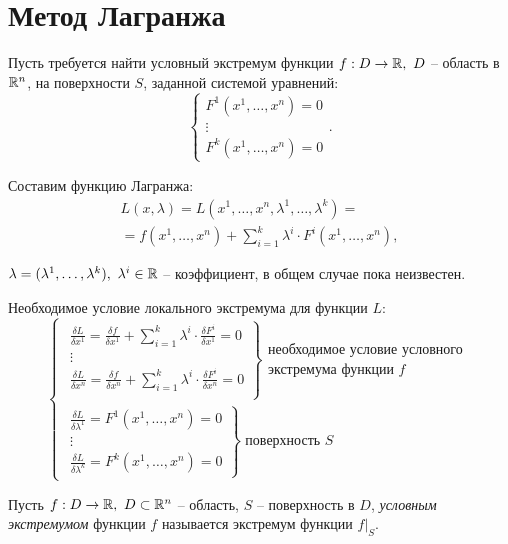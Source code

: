\section*{Метод Лагранжа}

\begin{task}
    Пусть требуется найти условный экстремум функции $f:D\rightarrow\mathbb{R}, \ D$ -- область в $\mathbb{R}^n$, на поверхности $S$, заданной системой уравнений:
    \[
        \left\{\begin{array}{l}
            F^1(x^1,\ldots,x^n) = 0 \\
            \vdots                  \\
            F^k(x^1,\ldots,x^n) = 0
          \end{array}\right..
    \]
    
    Составим функцию Лагранжа:
    \begin{multline*}
      L(x,\lambda) = L(x^1,\ldots,x^n,\lambda^1,\ldots,\lambda^k) = \\
      = f(x^1,\ldots,x^n) + \sum_{i=1}^{k}\lambda^i\cdot F^i(x^1,\ldots,x^n),
    \end{multline*}
    
    $\lambda = (\lambda^1,\ldots,\lambda^k), \ \lambda^i \in \R$ -- коэффициент, в общем случае пока неизвестен.
    
    Необходимое условие локального экстремума для функции $L:$
    \begin{equation}\label{eq:24}
      \left\{\begin{array}{l}
        \left.\begin{array}{l}
            \frac{\delta L}{\delta x^1} = \frac{\delta f}{\delta x^1} + \sum_{i = 1}^{k}\lambda^i\cdot\frac{\delta F^i}{\delta x^1} = 0 \\
            \vdots                                                                                                                      \\
            \frac{\delta L}{\delta x^n} = \frac{\delta f}{\delta x^n} + \sum_{i = 1}^{k}\lambda^i\cdot\frac{\delta F^i}{\delta x^n} = 0 \\
        \end{array}\right\}\begin{array}{l}
            \text{необходимое условие условного}\\
            \text{экстремума функции }f
        \end{array} \\
        \left.\begin{array}{l}
            \frac{\delta L}{\delta \lambda^1} = F^1(x^1,\ldots,x^n) = 0                                                                 \\
            \vdots                                                                                                                      \\
            \frac{\delta L}{\delta \lambda^k} = F^k(x^1,\ldots,x^n) = 0
        \end{array}\right\}\text{ поверхность }S
      \end{array}\right.
    \end{equation}
\end{task}

\begin{definition}
  Пусть $f:D\rightarrow\mathbb{R}, \ D \subset \mathbb{R}^n$ -- область, $S$ -- поверхность в $D$, \emph{условным экстремумом} функции $f$ называется экстремум функции $f\big|_S$.
\end{definition}